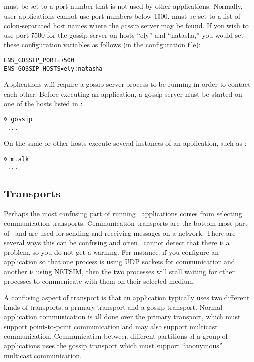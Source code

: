  must be set to a port number that
is not used by other applications.  Normally, user applications
cannot use port numbers below 1000.   must
be set to a list of colon-separated host names where the gossip
server may be found.  If you wish to use port 7500 for the gossip
server on hosts ``ely'' and ``natasha,'' you would set these
configuration variables as follows (in the configuration file):
\begin{verbatim}
ENS_GOSSIP_PORT=7500
ENS_GOSSIP_HOSTS=ely:natasha
\end{verbatim}

Applications will require a gossip server process to be running
in order to contact each other. Before executing an application, a
gossip server must be started on one of the hosts listed in
:
\begin{verbatim}
% gossip
 ...
\end{verbatim}
On the same or other hosts execute several instances of an
application, such as :
\begin{verbatim}
% mtalk
 ...
\end{verbatim}

\subsection{Transports}


Perhaps the most confusing part of running \ensemble\ applications
comes from selecting communication transports.  Communication
transports are the bottom-most part of \ensemble\ and are used for
sending and receiving messages on a network.  There are several ways
this can be confusing and often \ensemble\ cannot detect that there is
a problem, so you do not get a warning.  For instance, if you
configure an application so that one process is using UDP sockets for
communication and another is using NETSIM, then the two processes will
stall waiting for other processes to communicate with them on their
selected medium.

A confusing aspect of transport is that an application typically uses
two different kinds of transports: a primary transport and a gossip
transport.  Normal application communication is all done over the
primary transport, which must support point-to-point communication and
may also support multicast communication.  Communication between
different partitions of a group of applications uses the gossip
transport which must support ``anonymous'' multicast communication.

